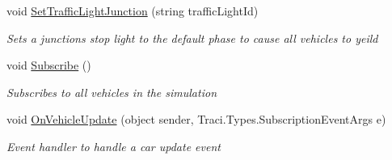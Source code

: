 \begin{DoxyCompactItemize}
void \mbox{\hyperlink{class_traci_controller_a058ad2eec9a474491fd1549c5b269e25}{Set\+Traffic\+Light\+Junction}} (string traffic\+Light\+Id)
\begin{DoxyCompactList}\small\item\em Sets a junction\textquotesingle{}s stop light to the default phase to cause all vehicles to yeild \end{DoxyCompactList}\item 
void \mbox{\hyperlink{class_traci_controller_aacc5a9530481fe986ee9329f07e4eccd}{Subscribe}} ()
\begin{DoxyCompactList}\small\item\em Subscribes to all vehicles in the simulation \end{DoxyCompactList}\item 
void \mbox{\hyperlink{class_traci_controller_ae059ca6ccc3a8ce34a4d133de3d5fade}{On\+Vehicle\+Update}} (object sender, Traci.\+Types.\+Subscription\+Event\+Args e)
\begin{DoxyCompactList}\small\item\em Event handler to handle a car update event \end{DoxyCompactList}\end{DoxyCompactItemize}

